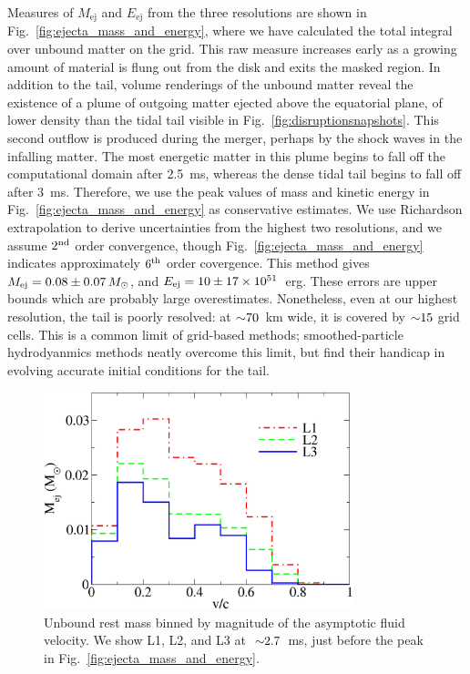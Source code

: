 Measures of $M_{\text{ej}}$ and $E_{\text{ej}}$ from the three resolutions
are shown in Fig.~\ref{fig:ejecta_mass_and_energy}, where we have calculated the total integral
over unbound matter on the grid.
This raw measure increases early as a growing amount of material
is flung out from the disk and exits the masked region.
In addition to the tail, volume renderings of the unbound matter reveal the existence of
a plume of outgoing matter ejected above the equatorial plane, of lower density than the tidal tail visible
in Fig.~\ref{fig:disruptionsnapshots}.  This second outflow is produced during
the merger, perhaps by the shock waves in the infalling matter. 
The most energetic matter in this plume begins to fall off the
computational domain after 2.5~ms, whereas the dense tidal tail begins to fall off
after 3~ms. Therefore, we use the peak values of mass and kinetic energy in
Fig.~\ref{fig:ejecta_mass_and_energy} as conservative estimates.
We use Richardson extrapolation to derive uncertainties from the highest two resolutions,
and we assume $2^{\rm nd}$ order convergence, though Fig.~\ref{fig:ejecta_mass_and_energy}
indicates approximately $6^{\rm th}$ order covergence. This method gives
$M_{\rm ej}= 0.08 \pm 0.07 \,M_{\odot}$, and
$E_{\rm ej} = 10 \pm 17 \times 10^{51}$~erg.
These errors are upper bounds which are probably large overestimates.
Nonetheless, even at our highest resolution, the tail is poorly resolved:
at $\mathord{\sim}70$~km wide, it is covered by $\mathord{\sim}15$ grid cells. This is a common limit
of grid-based methods; smoothed-particle hydrodyanmics methods neatly overcome this
limit, but find their handicap in evolving accurate initial conditions for the tail.

\begin{figure}
\centering
\includegraphics[width=9cm]{Figures/unbound_velocity_histogram}
\caption[Unbound matter asymptotic velocity]{
Unbound rest mass binned by magnitude of the asymptotic fluid velocity.
We show L1, L2, and L3 at $~\mathord{\sim}2.7$~ms, just before the peak in
Fig.~\ref{fig:ejecta_mass_and_energy}.
}
\label{fig:ejecta_velocity_histogram}
\end{figure}

